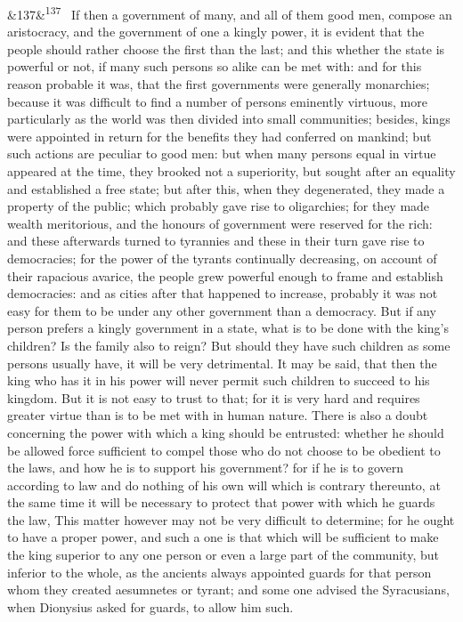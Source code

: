 \documentclass[12pt]{article}
\newcommand{\para}[1][]{\par\noindent\ifx&#1&\else\textsuperscript{\footnotesize #1}~\fi}
\begin{document}
\para[137] If then a government of many, and all of them good men, compose an aristocracy, and the government of one a kingly power, it is evident that the people should rather choose the first than the last; and this whether the state is powerful or not, if many such persons so alike can be met with: and for this reason probable it was, that the first governments were generally monarchies; because it was difficult to find a number of persons eminently virtuous, more particularly as the world was then divided into small communities; besides, kings were appointed in return for the benefits they had conferred on mankind; but such actions are peculiar to good men: but when many persons equal in virtue appeared at the time, they brooked not a superiority, but sought after an equality and established a free state; but after this, when they degenerated, they made a property of the public; which probably gave rise to oligarchies; for they made wealth meritorious, and the honours of government were reserved for the rich: and these afterwards turned to tyrannies and these in their turn gave rise to democracies; for the power of the tyrants continually decreasing, on account of their rapacious avarice, the people grew powerful enough to frame and establish democracies: and as cities after that happened to increase, probably it was not easy for them to be under any other government than a democracy. But if any person prefers a kingly government in a state, what is to be done with the king's children? Is the family also to reign? But should they have such children as some persons usually have, it will be very detrimental. It may be said, that then the king who has it in his power will never permit such children to succeed to his kingdom. But it is not easy to trust to that; for it is very hard and requires greater virtue than is to be met with in human nature. There is also a doubt concerning the power with which a king should be entrusted: whether he should be allowed force sufficient to compel those who do not choose to be obedient to the laws, and how he is to support his government? for if he is to govern according to law and do nothing of his own will which is contrary thereunto, at the same time it will be necessary to protect that power with which he guards the law, This matter however may not be very difficult to determine; for he ought to have a proper power, and such a one is that which will be sufficient to make the king superior to any one person or even a large part of the community, but inferior to the whole, as the ancients always appointed guards for that person whom they created aesumnetes or tyrant; and some one advised the Syracusians, when Dionysius asked for guards, to allow him such.
\end{document}
